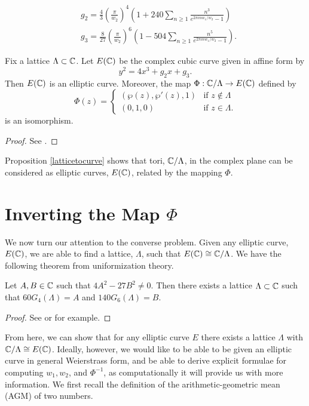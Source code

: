 \begin{subequations}\label{the gs}
\begin{align}
&g_2 = \frac{4}{3}\left(\frac{\pi}{w_2}\right)^4\left(1 + 240 \sum_{n\ge 1} \frac{n^3}{e^{2\pi i n w_1/w_2} -1}\right) \\
&g_3 = \frac{8}{27}\left(\frac{\pi}{w_2}\right)^6\left(1 - 504 \sum_{n\ge 1} \frac{n^5}{e^{2\pi i n w_1/w_2} -1}\right).
\end{align}
\end{subequations}

\begin{prop}\label{latticetocurve}
Fix a lattice $\Lambda \subset \mathbb{C}$. Let $E(\mathbb{C})$ be the complex cubic curve given in affine form by
$$y^2 = 4 x^3 + g_2 x + g_3.$$
Then $E(\mathbb{C})$ is an elliptic curve. Moreover, the map $\Phi:\mathbb{C}/\Lambda \to E(\mathbb{C})$ defined by
\begin{equation}\label{weierstrasswp}
\Phi(z) = \left\{
	\begin{array}{ll}
		(\wp(z), \wp'(z), 1) & \mbox{if } z \not\in \Lambda \\
		(0,1,0) & \mbox{if } z  \in \Lambda.
	\end{array}
\right.
\end{equation}
is an isomorphism.
\end{prop}
\begin{proof}
See \cite[Page 170]{Silverman}.
\end{proof}
Proposition \ref{latticetocurve} shows that tori, $\mathbb{C}/\Lambda$, in the complex plane can be considered as elliptic curves, $E(\mathbb{C})$, related by the mapping $\Phi$.


\section{Inverting the Map $\Phi$}
We now turn our attention to the converse problem. Given any elliptic curve, $E(\mathbb{C})$, we are able to find a lattice, $\Lambda$, such that $E(\mathbb{C}) \cong \mathbb{C}/\Lambda$. We have the following theorem from uniformization theory.

\begin{thm}  Let $A,B \in \mathbb{C}$ such that $4A^2-27B^2 \not= 0$. Then there exists a lattice $\Lambda \subset \mathbb{C}$ such that $60G_4(\Lambda) = A$  and $140G_6(\Lambda) = B$.
\end{thm}
\begin{proof}
See \cite[Section 4.2]{Shimura1} or \cite[Proposisiont VII.5]{MR0344216} for example.
\end{proof}
From here, we can show that for any elliptic curve $E$ there exists a lattice $\Lambda$ with $\mathbb{C}/\Lambda \cong E(\mathbb{C})$.
Ideally, however, we would like to be able to be given an elliptic curve in general Weierstrass form, and be able to derive explicit formulae for computing $w_1, w_2$, and $\Phi^{-1}$, as computationally it will provide us with more information. We first recall the definition of the arithmetic-geometric mean (AGM) of two numbers.

